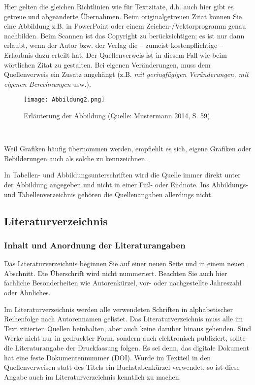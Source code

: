 \documentclass[a4paper,11pt]{article}%
\renewcommand{\\}{\vspace*{0.5\baselineskip} \newline}
\begin{document}
Hier gelten die gleichen Richtlinien wie für Textzitate, d.h. auch hier gibt es getreue und abgeänderte Übernahmen. Beim originalgetreuen Zitat können Sie eine Abbildung z.B. in PowerPoint oder einem Zeichen-/Vektorprogramm genau nachbilden. Beim Scannen ist das Copyright zu berücksichtigen; es ist nur dann erlaubt, wenn der Autor bzw. der Verlag die – zumeist kostenpflichtige – Erlaubnis dazu erteilt hat. Der Quellenverweis ist in diesem Fall wie beim wörtlichen Zitat zu gestalten. Bei eigenen Veränderungen, muss dem Quellenverweis ein Zusatz angehängt (z.B. \textit{mit geringfügigen Veränderungen, mit eigenen Berechnungen} usw.).

\begin{figure}[h]

	\texttt{[image: Abbildung2.png]}\\

	\caption[Abbildung 2]{Erläuterung der Abbildung (Quelle: Mustermann 2014, S. 59)}

\end{figure}

~\newline

Weil Grafiken häufig übernommen werden, empfiehlt es sich, eigene Grafiken oder Bebilderungen auch als solche zu kennzeichnen.\newline

In Tabellen- und Abbildungsunterschriften wird die Quelle immer direkt unter der Abbildung angegeben und nicht in einer Fuß- oder Endnote. Ins Abbildungs- und Tabellenverzeichnis gehören die Quellenangaben allerdings nicht.



\subsection{Literaturverzeichnis}

\subsubsection{Inhalt und Anordnung der Literaturangaben}

Das Literaturverzeichnis beginnen Sie auf einer neuen Seite und in einem neuen Abschnitt. Die Überschrift wird nicht nummeriert. Beachten Sie auch hier fachliche Besonderheiten wie Autorenkürzel, vor- oder nachgestellte Jahreszahl oder Ähnliches. \\

Im Literaturverzeichnis werden alle verwendeten Schriften in alphabetischer Reihenfolge nach Autorennamen gelistet. Das Literaturverzeichnis muss alle im Text zitierten Quellen beinhalten, aber auch keine darüber hinaus gehenden. Sind Werke nicht nur in gedruckter Form, sondern auch elektronisch publiziert, sollte die Literaturangabe der Druckfassung folgen. Es sei denn, das digitale Dokument hat eine feste Dokumentennummer (DOI). Wurde im Textteil in den Quellenverweisen statt des Titels ein Buchstabenkürzel verwendet, so ist diese Angabe auch im Literaturverzeichnis kenntlich zu machen.\\
\end{document}
